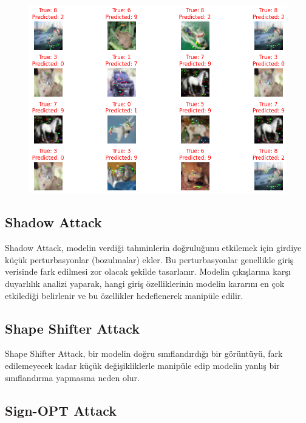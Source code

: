 \begin{figure}[h]
    \centering
    \includegraphics[width=1\textwidth]{images/jsma_results.png}
    \caption{}
\end{figure}

\newpage

\subsection{Shadow Attack}

Shadow Attack, modelin verdiği tahminlerin doğruluğunu etkilemek için girdiye küçük perturbasyonlar (bozulmalar) ekler. Bu perturbasyonlar genellikle giriş verisinde fark edilmesi zor olacak şekilde tasarlanır. Modelin çıkışlarına karşı duyarlılık analizi yaparak, hangi giriş özelliklerinin modelin kararını en çok etkilediği belirlenir ve bu özellikler hedeflenerek manipüle edilir.

\newpage

\subsection{Shape Shifter Attack}

Shape Shifter Attack, bir modelin doğru sınıflandırdığı bir görüntüyü, fark edilemeyecek kadar küçük değişikliklerle manipüle edip modelin yanlış bir sınıflandırma yapmasına neden olur.

\newpage

\subsection{Sign-OPT Attack}

